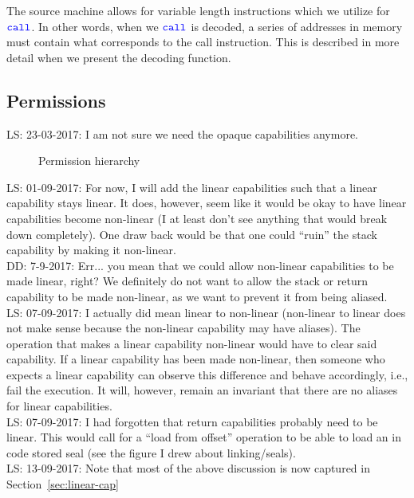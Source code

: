 \documentclass[a3paper]{article}
\newcommand\lau[1]{{\color{purple} \sf \footnotesize {LS: #1}}\\}
\newcommand\dominique[1]{{\color{purple} \sf \footnotesize {DD: #1}}\\}
\newcommand{\sourcecolor}{\color{blue}}
\newcommand{\src}[1]{{\sourcecolor #1}}
\newcommand{\zinstr}[1]{\texttt{#1}}
\newcommand{\scall}[3][]{  
\ifthenelse{\equal{#2#3}{}}
  {\ensuremath{\zinstr{\src{call}}_{#1}}}
  {\ensuremath{\zinstr{\src{call}}_{#1} \; #2 \; #3}}
}
\newcommand{\plainperm}[1]{\textsc{#1}}
\newcommand{\rwx}{\plainperm{rwx}}
\newcommand{\rx}{\plainperm{rx}}
\newcommand{\rw}{\plainperm{rw}}
\newcommand{\readonly}{\plainperm{r}}
\newcommand{\noperm}{\plainperm{0}}
\begin{document}
The source machine allows for variable length instructions which we utilize for $\scall{}{}$. In other words, when we $\scall{}{}$ is decoded, a series of addresses in memory must contain what corresponds to the call instruction. This is described in more detail when we present the decoding function.

\subsection{Permissions}
\lau{23-03-2017: I am not sure we need the opaque capabilities anymore.} %
\begin{figure}[!h]
  \centering

  \caption{Permission hierarchy}
  \label{fig:perm-hier}
\end{figure}
\lau{01-09-2017: For now, I will add the linear capabilities such that a linear capability stays linear. It does, however, seem like it would be okay to have linear capabilities become non-linear (I at least don't see anything that would break down completely). One draw back would be that one could ``ruin'' the stack capability by making it non-linear.}
\dominique{7-9-2017: Err... you mean that we could allow non-linear capabilities to be made linear, right?  We definitely do not want to allow the stack or return capability to be made non-linear, as we want to prevent it from being aliased.}
\lau{07-09-2017: I actually did mean linear to non-linear (non-linear to linear does not make sense because the non-linear capability may have aliases). The operation that makes a linear capability non-linear would have to clear said capability. If a linear capability has been made non-linear, then someone who expects a linear capability can observe this difference and behave accordingly, i.e., fail the execution. It will, however, remain an invariant that there are no aliases for linear capabilities.}
\lau{07-09-2017: I had forgotten that return capabilities probably need to be linear. This would call for a ``load from offset'' operation to be able to load an in code stored seal (see the figure I drew about linking/seals).}
\lau{13-09-2017: Note that most of the above discussion is now captured in Section~\ref{sec:linear-cap}}
\end{document}
